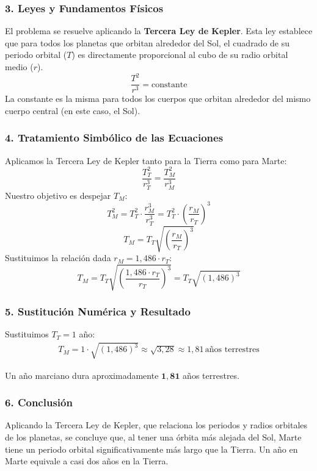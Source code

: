 \subsubsection*{3. Leyes y Fundamentos Físicos}
El problema se resuelve aplicando la \textbf{Tercera Ley de Kepler}. Esta ley establece que para todos los planetas que orbitan alrededor del Sol, el cuadrado de su periodo orbital ($T$) es directamente proporcional al cubo de su radio orbital medio ($r$).
$$\frac{T^2}{r^3} = \text{constante}$$
La constante es la misma para todos los cuerpos que orbitan alrededor del mismo cuerpo central (en este caso, el Sol).

\subsubsection*{4. Tratamiento Simbólico de las Ecuaciones}
Aplicamos la Tercera Ley de Kepler tanto para la Tierra como para Marte:
$$\frac{T_T^2}{r_T^3} = \frac{T_M^2}{r_M^3}$$
Nuestro objetivo es despejar $T_M$:
$$T_M^2 = T_T^2 \cdot \frac{r_M^3}{r_T^3} = T_T^2 \cdot \left(\frac{r_M}{r_T}\right)^3$$
$$T_M = T_T \sqrt{\left(\frac{r_M}{r_T}\right)^3}$$
Sustituimos la relación dada $r_M = 1,486 \cdot r_T$:
$$T_M = T_T \sqrt{\left(\frac{1,486 \cdot r_T}{r_T}\right)^3} = T_T \sqrt{(1,486)^3}$$

\subsubsection*{5. Sustitución Numérica y Resultado}
Sustituimos $T_T = 1$ año:
\begin{gather}
    T_M = 1 \cdot \sqrt{(1,486)^3} \approx \sqrt{3,28} \approx 1,81 \, \text{años terrestres}
\end{gather}
\begin{cajaresultado}
Un año marciano dura aproximadamente $\boldsymbol{1,81}$ años terrestres.
\end{cajaresultado}

\subsubsection*{6. Conclusión}
\begin{cajaconclusion}
Aplicando la Tercera Ley de Kepler, que relaciona los periodos y radios orbitales de los planetas, se concluye que, al tener una órbita más alejada del Sol, Marte tiene un periodo orbital significativamente más largo que la Tierra. Un año en Marte equivale a casi dos años en la Tierra.
\end{cajaconclusion}

